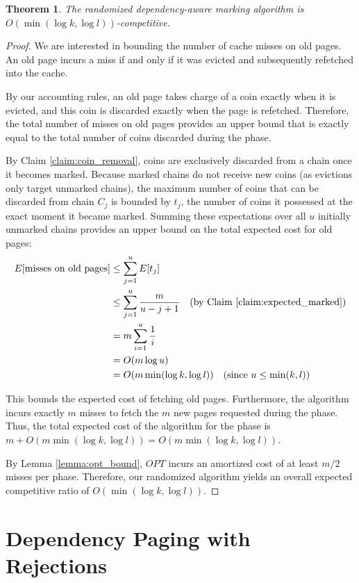 \documentclass[a4paper]{article}
\newtheorem{theorem}{Theorem}    %
\begin{document}
\begin{theorem}
\label{thm:randomized_O_log_k_l}
The randomized dependency-aware marking algorithm is $O(\min(\log k, \log l))$-competitive.
\end{theorem}
\begin{proof}
We are interested in bounding the number of cache misses on old pages. An old page incurs a miss if and only if it was evicted and subsequently refetched into the cache. 

By our accounting rules, an old page takes charge of a coin exactly when it is evicted, and this coin is discarded exactly when the page is refetched. Therefore, the total number of misses on old pages provides an upper bound that is exactly equal to the total number of coins discarded during the phase.

By Claim \ref{claim:coin_removal}, coins are exclusively discarded from a chain once it becomes marked. Because marked chains do not receive new coins (as evictions only target unmarked chains), the maximum number of coins that can be discarded from chain $C_j$ is bounded by $t_j$, the number of coins it possessed at the exact moment it became marked. Summing these expectations over all $u$ initially unmarked chains provides an upper bound on the total expected cost for old pages:
\begin{align*}
    E[\text{misses on old pages}] &\le \sum_{j=1}^{u} E[t_j] \\
    &\le \sum_{j=1}^{u} \frac{m}{u - j + 1} \quad \text{(by Claim \ref{claim:expected_marked})} \\
    &= m \sum_{i=1}^{u} \frac{1}{i} \\
    &= O(m \log u) \\
    &= O(m \min(\log k, \log l)) \quad \text{(since } u \le \min(k, l)\text{)}
\end{align*}

This bounds the expected cost of fetching old pages. Furthermore, the algorithm incurs exactly $m$ misses to fetch the $m$ new pages requested during the phase. Thus, the total expected cost of the algorithm for the phase is $m + O(m \min(\log k, \log l)) = O(m \min(\log k, \log l))$. 

By Lemma \ref{lemma:opt_bound}, $OPT$ incurs an amortized cost of at least $m/2$ misses per phase. Therefore, our randomized algorithm yields an overall expected competitive ratio of $O(\min(\log k, \log l))$.
\end{proof}

\section{Dependency Paging with Rejections}
\end{document}

